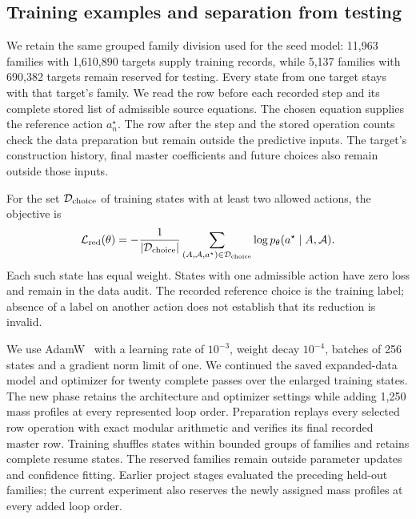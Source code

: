 \subsection{Training examples and separation from testing}
We retain the same grouped family division used for the seed model:
11,963 families with 1,610,890 targets supply training records, while
5,137 families with 690,382 targets remain reserved for testing.
Every state from one target stays with that target's family.
We read the row before each recorded step and its complete stored list
of admissible source equations. The chosen equation supplies the
reference action $a_n^\star$. The row after the step and the stored
operation counts check the data preparation but remain outside
the predictive inputs. The target's construction history, final master
coefficients and future choices also remain outside those inputs.

For the set $\mathcal D_{\rm choice}$ of training states with at least
two allowed actions, the objective is
\begin{equation}
 \mathcal L_{\rm red}(\theta)
 =-\frac{1}{|\mathcal D_{\rm choice}|}
   \sum_{(A,\mathcal A,a^\star)\in\mathcal D_{\rm choice}}
           \log p_\theta(a^\star\mid A,\mathcal A).
 \label{eq:reduction-loss}
\end{equation}
Each such state has equal weight. States with one admissible action
have zero loss and remain in the data audit. The recorded reference
choice is the training label; absence of a label on another action does
not establish that its reduction is invalid.

We use AdamW~\cite{AdamW} with a learning rate of $10^{-3}$, weight decay
$10^{-4}$, batches of 256 states and a gradient norm limit of one.
We continued the saved expanded-data model and optimizer for twenty
complete passes over the enlarged training states. The new phase
retains the architecture and optimizer settings while adding 1,250
mass profiles at every represented loop order. Preparation replays every selected row
operation with exact modular arithmetic and verifies its final
recorded master row. Training shuffles states within bounded
groups of families and retains complete resume states.
The reserved families remain outside parameter updates and
confidence fitting. Earlier project stages evaluated the preceding
held-out families; the current experiment also reserves the newly
assigned mass profiles at every added loop order.


